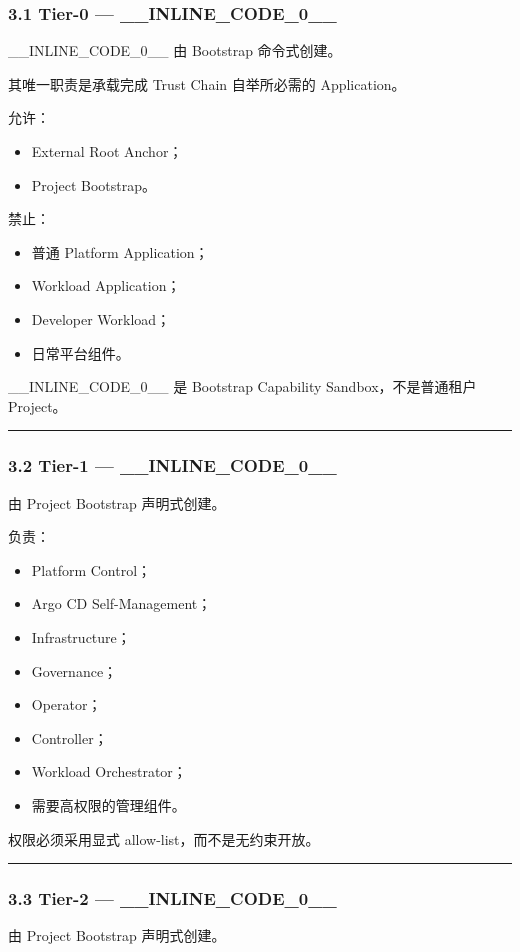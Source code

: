 \documentclass[11pt,a4paper]{article}
\begin{document}
\subsubsection{3.1 Tier-0 — \_\_INLINE\_CODE\_0\_\_}
\_\_INLINE\_CODE\_0\_\_ 由 Bootstrap 命令式创建。

其唯一职责是承载完成 Trust Chain 自举所必需的 Application。

允许：

\begin{itemize}
  \item External Root Anchor；
  \item Project Bootstrap。
\end{itemize}
禁止：

\begin{itemize}
  \item 普通 Platform Application；
  \item Workload Application；
  \item Developer Workload；
  \item 日常平台组件。
\end{itemize}
\_\_INLINE\_CODE\_0\_\_ 是 Bootstrap Capability Sandbox，不是普通租户 Project。

\vspace{0.5em}\hrule\vspace{0.5em}
\subsubsection{3.2 Tier-1 — \_\_INLINE\_CODE\_0\_\_}
由 Project Bootstrap 声明式创建。

负责：

\begin{itemize}
  \item Platform Control；
  \item Argo CD Self-Management；
  \item Infrastructure；
  \item Governance；
  \item Operator；
  \item Controller；
  \item Workload Orchestrator；
  \item 需要高权限的管理组件。
\end{itemize}
权限必须采用显式 allow-list，而不是无约束开放。

\vspace{0.5em}\hrule\vspace{0.5em}
\subsubsection{3.3 Tier-2 — \_\_INLINE\_CODE\_0\_\_}
由 Project Bootstrap 声明式创建。
\end{document}
